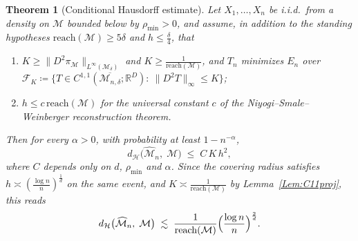 \documentclass[11pt]{amsart}%
\theoremstyle{plain}
\newtheorem{theorem}[definition]{Theorem}
\newcommand{\R}{{\mathbb R}}
\def\calH{{\mathcal{H}}}
\newcommand{\1}{\mathbf{1}}
\newcommand{\M}{\mathcal{M}}
\begin{document}
\begin{theorem}[Conditional Hausdorff estimate]
    \label{Thm:HausdorffConditional}
    Let $X_1,\dots,X_n$ be i.i.d.\ from a density on $\M$ bounded below by $\rho_{\min}>0$, and
    assume, in addition to the standing hypotheses $\mathrm{reach}(\M)\ge 5\delta$ and
    $h\le\frac{\delta}{4}$, that
    \begin{enumerate}[label=(\roman*),leftmargin=2.2em,itemsep=1pt,topsep=2pt]
        \item $K\ge\|D^2\pi_\M\|_{L^\infty(\M_\delta)}$ and $K\ge \frac{1}{\mathrm{reach}(\M)}$, and $T_n$
              minimizes $E_n$ over
              $\mathcal F_K\coloneqq\{T\in C^{1,1}(\overline{\M_{n,\delta}};\R^D):\ \|D^2T\|_\infty\le K\}$;
        \item $h\le c\,\mathrm{reach}(\M)$ for the universal constant $c$ of the Niyogi--Smale--Weinberger reconstruction theorem.
    \end{enumerate}
    Then for every $\alpha>0$, with probability at least $1-n^{-\alpha}$,
    \[
        d_\calH\bigl(\widehat{\M}_n,\;\M\bigr)\;\le\;C\,K\,h^2 ,
    \]
    where $C$ depends only on $d$, $\rho_{\min}$ and $\alpha$. Since the covering radius satisfies
    $h\asymp\left(\frac{\log n}{n}\right)^{\frac{1}{d}}$ on the same event, and $K\asymp \frac{1}{\mathrm{reach}(\M)}$ by
    Lemma~\ref{Lem:C11proj}, this reads
    \[
        d_\calH\bigl(\widehat{\M}_n,\;\M\bigr)\;\lesssim\;\frac{1}{\mathrm{reach}(\M)}
        \Bigl(\frac{\log n}{n}\Bigr)^{\frac{2}{d}}.
    \]
\end{theorem}
\end{document}
